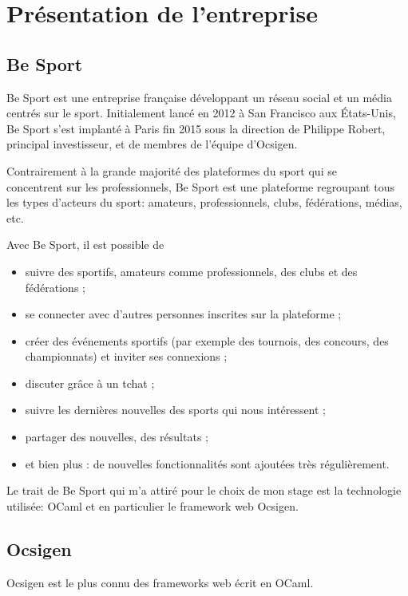 \section{Présentation de l'entreprise}

\subsection{Be Sport}

Be Sport\cite{besport} est une entreprise française développant un réseau social
et un média centrés sur le sport. Initialement lancé en 2012 à San Francisco
aux États-Unis, Be Sport s'est implanté à Paris fin 2015 sous la
direction de Philippe Robert, principal investisseur, et de membres de l'équipe d'Ocsigen.

Contrairement à la grande majorité des plateformes du sport qui se \\ concentrent
sur les professionnels, Be Sport est une plateforme regroupant tous les
types d'acteurs du sport: amateurs, professionnels, clubs, fédérations, médias,
etc.

Avec Be Sport, il est possible de

\begin{itemize}
  \item suivre des sportifs, amateurs comme professionnels, des clubs et des
    fédérations ;
  \item se connecter avec d'autres personnes inscrites sur la plateforme ;
  \item créer des événements sportifs (par exemple des tournois, des concours,
    des championnats) et inviter ses connexions ;
  \item discuter grâce à un tchat ;
  \item suivre les dernières nouvelles des sports qui nous intéressent ;
  \item partager des nouvelles, des résultats ;
  \item et bien plus : de nouvelles fonctionnalités sont ajoutées très régulièrement.
\end{itemize}

Le trait de Be Sport qui m'a attiré pour le choix de mon stage est la
technologie utilisée: OCaml et en particulier le framework web Ocsigen.

\subsection{Ocsigen}

Ocsigen\cite{ocsigen-website} est le plus connu des frameworks web écrit en
OCaml.

